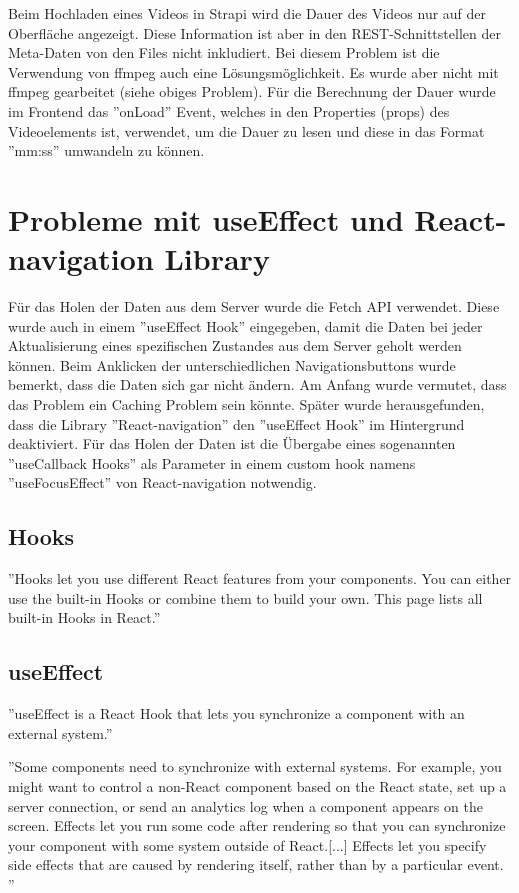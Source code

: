 Beim Hochladen eines Videos in Strapi
wird die Dauer des Videos nur auf der Oberfläche angezeigt.
Diese Information ist aber in den REST-Schnittstellen der Meta-Daten von den Files nicht inkludiert.
Bei diesem Problem ist die Verwendung von ffmpeg auch eine Lösungsmöglichkeit.
Es wurde aber nicht mit ffmpeg gearbeitet (siehe obiges Problem).
Für die Berechnung der Dauer wurde im Frontend das ''onLoad'' Event,
welches in den Properties (props) des Videoelements ist, verwendet,
um die Dauer zu lesen und diese in das Format ''mm:ss'' umwandeln zu können.





\section{Probleme mit useEffect und React-navigation Library}\label{sec:probleme-mit-useeffect-und-react-navigation-library}
Für das Holen der Daten aus dem Server wurde die Fetch API verwendet.
Diese wurde auch in einem ''useEffect Hook'' eingegeben, damit die Daten bei jeder Aktualisierung eines spezifischen
Zustandes aus dem Server geholt werden können.
Beim Anklicken der unterschiedlichen Navigationsbuttons wurde bemerkt,
dass die Daten sich gar nicht ändern.
Am Anfang wurde vermutet, dass das Problem ein Caching Problem sein könnte.
Später wurde herausgefunden, dass die Library ''React-navigation'' den ''useEffect Hook'' im Hintergrund deaktiviert.
Für das Holen der Daten ist die Übergabe eines sogenannten
''useCallback Hooks'' als Parameter in einem custom hook namens ''useFocusEffect''
von React-navigation notwendig.\cite{issuesWithUseEffect}


\subsection{Hooks}\label{subsec:hooks}
''Hooks let you use different React features from your components.
You can either use the built-in Hooks or combine them to build your own.
This page lists all built-in Hooks in React.''
\cite{hooks}

\subsection{useEffect}\label{subsec:useeffect}
''useEffect is a React Hook that lets you synchronize a component with an external system.''\cite{useEffect}

''Some components need to synchronize with external systems.
For example, you might want to control a non-React component based on the React state, set up a server connection,
or send an analytics log when a component appears on the screen.
Effects let you run some code after rendering so that you can synchronize your component with some system outside of React.[...]
Effects let you specify side effects that are caused by rendering itself,
rather than by a particular event. ''
\cite{Synchronizing-with-effects}




